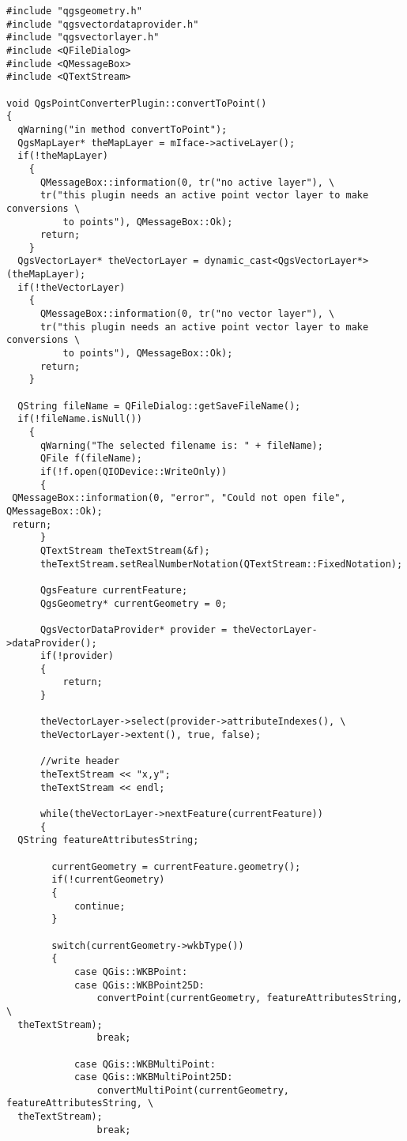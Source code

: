 \begin{verbatim}
#include "qgsgeometry.h"
#include "qgsvectordataprovider.h"
#include "qgsvectorlayer.h"
#include <QFileDialog>
#include <QMessageBox>
#include <QTextStream>

void QgsPointConverterPlugin::convertToPoint()
{
  qWarning("in method convertToPoint");
  QgsMapLayer* theMapLayer = mIface->activeLayer();
  if(!theMapLayer)
    {
      QMessageBox::information(0, tr("no active layer"), \
      tr("this plugin needs an active point vector layer to make conversions \ 
          to points"), QMessageBox::Ok);
      return;
    }
  QgsVectorLayer* theVectorLayer = dynamic_cast<QgsVectorLayer*>(theMapLayer);
  if(!theVectorLayer)
    {
      QMessageBox::information(0, tr("no vector layer"), \
      tr("this plugin needs an active point vector layer to make conversions \
          to points"), QMessageBox::Ok);
      return;
    }
  
  QString fileName = QFileDialog::getSaveFileName();
  if(!fileName.isNull())
    {
      qWarning("The selected filename is: " + fileName);
      QFile f(fileName);
      if(!f.open(QIODevice::WriteOnly))
      {
 QMessageBox::information(0, "error", "Could not open file", QMessageBox::Ok);
 return;
      }
      QTextStream theTextStream(&f);
      theTextStream.setRealNumberNotation(QTextStream::FixedNotation);

      QgsFeature currentFeature;
      QgsGeometry* currentGeometry = 0;

      QgsVectorDataProvider* provider = theVectorLayer->dataProvider();
      if(!provider)
      {
          return;
      }

      theVectorLayer->select(provider->attributeIndexes(), \
      theVectorLayer->extent(), true, false);

      //write header
      theTextStream << "x,y";
      theTextStream << endl;

      while(theVectorLayer->nextFeature(currentFeature))
      {
  QString featureAttributesString;
      
        currentGeometry = currentFeature.geometry();
        if(!currentGeometry)
        {
            continue;
        }

        switch(currentGeometry->wkbType())
        {
            case QGis::WKBPoint:
            case QGis::WKBPoint25D:
                convertPoint(currentGeometry, featureAttributesString, \
  theTextStream);
                break;

            case QGis::WKBMultiPoint:
            case QGis::WKBMultiPoint25D:
                convertMultiPoint(currentGeometry, featureAttributesString, \
  theTextStream);
                break;


\end{verbatim}
